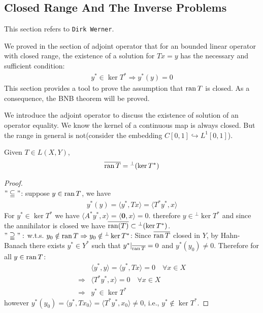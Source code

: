 \subsection{Closed Range And The Inverse Problems}
This section refers to \texttt{Dirk Werner}. \par 
 We proved in the section of adjoint operator that for an bounded linear operator with closed range, the existence of a solution for $Tx = y$ has the necessary and sufficient condition:
\begin{align*}
	y^* \in \ker T^* \Rightarrow y^*(y) = 0
\end{align*}
This section provides a tool to prove the assumption that $\operatorname{ran} T$ is closed. As a consequence, the BNB theorem will be proved.

 We introduce the adjoint operator to discuss the existence of solution of an operator equality. We know the kernel of a continuous map is always closed. But the range in general is not(consider the embedding $C[0, 1] \hookrightarrow L^1[0, 1]$).
 

 
\begin{lemma}
Given $T \in L(X, Y)$,
	\begin{align*}
		\overline{\operatorname{ran} T} = {}^\perp (\ker T^*)
	\end{align*}
\end{lemma}
\begin{proof}
\quad\\
$"\subseteqq"$: suppose $y \in \operatorname{ran} T$, we have
\begin{align*}
	y^*(y) = \langle y^*, T x \rangle = \langle T^* y ^*, x\rangle
\end{align*}
For $y^* \in \ker T^*$ we have $\langle A^* y^*, x \rangle = \langle \textbf{0}, x \rangle = 0$. therefore $y \in {}^\perp \ker T^*$ and since the annihilator is closed we have $\overline{\operatorname{ran}(T)} \subset {}^\perp (\ker T^*)$. \\
$"\supseteqq":$ w.t.s. $y_0 \notin \operatorname{ran} T \Rightarrow y_0 \notin {}^\perp \ker T^*$: Since $\overline{\operatorname{ran} T}$ closed in $Y$, by Hahn-Banach there exists $y^* \in Y^*$ such that $y^*|_{\overline{\operatorname{ran} T}} = 0$ and $y^*(y_0) \neq 0$. Therefore for all $y \in \operatorname{ran} T$:
\begin{align*}
	&\langle y^*, y\rangle =  \langle y^*, Tx \rangle = 0 \quad \forall x \in X \\
	\Rightarrow & \langle T^* y^*, x \rangle = 0  \quad \forall x \in X\\
	\Rightarrow & y^* \in \ker T^*
\end{align*}
however $y^*(y_0) = \langle y^*, Tx_0 \rangle = \langle T^* y^*, x_0 \rangle  \neq 0 $, i.e., $y^* \notin \ker T^*$. \Lightning
\end{proof}

